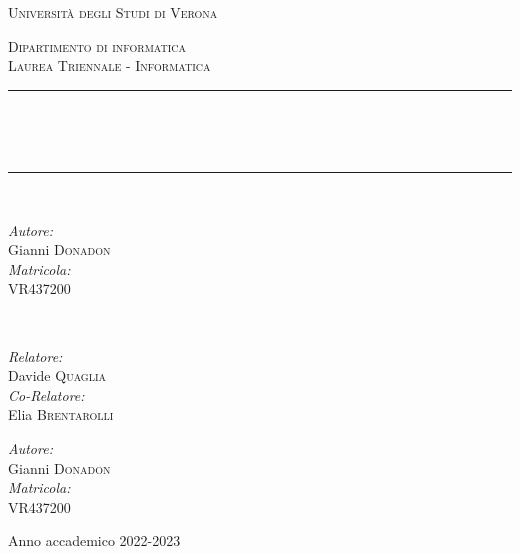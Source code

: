 
\begin{titlepage}

    \centering
    {\scshape\LARGE Università degli Studi di Verona \par}
    \vspace{1.5cm}
    \textsc{\Large Dipartimento di informatica}\\[0.5cm]
    \textsc{\large Laurea Triennale - Informatica}\\[0.5cm]
    \vspace{1.5cm}

    \rule{\linewidth}{0.35 mm} \\[0.4 cm]
    {\huge \bfseries \reportitle \par} \
    \rule{\linewidth}{0.35 mm} \\[1.5 cm]
    \vspace{1cm}

    {
    \begin{minipage}{0.5\textwidth}
        \begin{flushleft}
            \large
            \textit{Autore:}\\
            Gianni \textsc{Donadon}\\
            \textit{Matricola:}\\
            VR437200
        \end{flushleft}
    \end{minipage}
    ~
    \begin{minipage}{0.4\textwidth}
        \begin{flushright}
            \large
            \textit{Relatore:}\\
            Davide \textsc{Quaglia}\\
            \textit{Co-Relatore:}\\
            Elia \textsc{Brentarolli}
        \end{flushright}
    \end{minipage}
    }{
    \begin{minipage}{1\textwidth}
        \begin{flushleft}
            \large
            \textit{Autore:}\\
            Gianni \textsc{Donadon}\\
            \textit{Matricola:}\\
            VR437200
        \end{flushleft}
    \end{minipage}
    }

    \vfill\vfill\vfill
    {\large Anno accademico 2022-2023 \par}

\end{titlepage}